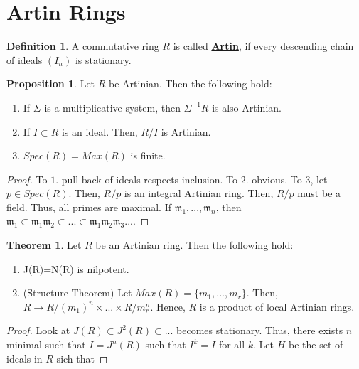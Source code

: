 \documentclass{article}
\theoremstyle{definition}
\newtheorem{theorem}{Theorem}[section]
\theoremstyle{definition}
\theoremstyle{definition}
\newtheorem{proposition}{Proposition}[section]
\theoremstyle{definition}
\theoremstyle{definition}
\newtheorem{definition}{Definition}[section]
\theoremstyle{definition}
\theoremstyle{definition}
\begin{document}
\section{Artin Rings}

\begin{tcolorbox}[colback=purple!5!white,colframe=purple!75!black]
\begin{definition}
A commutative ring $R$ is called \underline{\textbf{Artin}}, if every descending chain of ideals $(I_n)$ is stationary. 
\end{definition}
\end{tcolorbox}

\begin{tcolorbox}[colback=blue!5!white,colframe=blue!30!white]
\begin{proposition}
Let $R$ be Artinian. Then the following hold:
\begin{enumerate}
    \item If $\Sigma$ is a multiplicative system, then $\Sigma^{-1}R$ is also Artinian.
    \item If $I\subset R$ is an ideal. Then, $R/I$ is Artinian. 
    \item $Spec(R)=Max(R)$ is finite. 
\end{enumerate}
\end{proposition}
\end{tcolorbox}
\begin{proof}
    To $1$. pull back of ideals respects inclusion. To $2$. obvious. To $3$, let $p\in Spec(R)$. Then, $R/p$ is an integral Artinian ring. Then, $R/p$ must be a field. Thus, all primes are maximal. If $\mathfrak{m_1},...,\mathfrak{m}_n$, then $\mathfrak{m}_1\subset \mathfrak{m}_1\mathfrak{m}_2\subset ...\subset \mathfrak{m_1}\mathfrak{m}_2\mathfrak{m}_3....$
\end{proof}


\begin{tcolorbox}[colback=red!5!white,colframe=red!30!white]
\begin{theorem}
Let $R$ be an Artinian ring. Then the following hold:
\begin{enumerate}
    \item J(R)=N(R) is nilpotent.
    \item (Structure Theorem) Let $Max(R)=\{m_1,...,m_r\}$. Then, $R\to R/(m_1)^n\times...\times R/m_r^n$. Hence, $R$ is a product of local Artinian rings. 
\end{enumerate}
\end{theorem}
\end{tcolorbox}
\begin{proof}
    Look at $J(R)\subset J^2(R)\subset ...$ becomes stationary. Thus, there exists $n$ minimal such that $I=J^n(R)$ such that $I^k=I$ for all $k$. Let $H$ be the set of ideals in $R$ sich that  
\end{proof}
\end{document}
